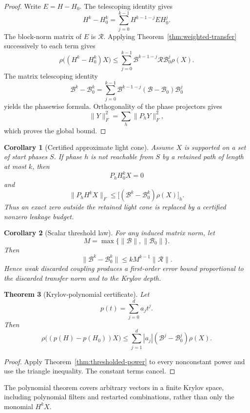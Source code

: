 \documentclass[11pt]{article}
\newtheorem{theorem}{Theorem}[section]
\newtheorem{corollary}[theorem]{Corollary}
\theoremstyle{definition}
\theoremstyle{remark}
\begin{document}
\begin{proof}
Write $E=H-H_0$.  The telescoping identity gives
\[
H^k-H_0^k
=
\sum_{j=0}^{k-1}H^{k-1-j}EH_0^j.
\]
The block-norm matrix of $E$ is $\mathcal R$.  Applying
Theorem~\ref{thm:weighted-transfer} successively to each term gives
\[
\rho\bigl((H^k-H_0^k)X\bigr)
\leq
\sum_{j=0}^{k-1}
\mathcal B^{k-1-j}\mathcal R\mathcal B_0^j\rho(X).
\]
The matrix telescoping identity
\[
\mathcal B^k-\mathcal B_0^k
=
\sum_{j=0}^{k-1}
\mathcal B^{k-1-j}(\mathcal B-\mathcal B_0)\mathcal B_0^j
\]
yields the phasewise formula.  Orthogonality of the phase projectors gives
\[
\lVert Y\rVert_F^2=\sum_h\lVert P_hY\rVert_F^2,
\]
which proves the global bound.
\end{proof}

\begin{corollary}[Certified approximate light cone]
\label{cor:approx-lightcone}
Assume $X$ is supported on a set of start phases $S$.  If phase $h$ is not
reachable from $S$ by a retained path of length at most $k$, then
\[
P_hH_0^kX=0
\]
and
\[
\boxed{
\lVert P_hH^kX\rVert_F
\leq
\bigl[(\mathcal B^k-\mathcal B_0^k)\rho(X)\bigr]_h.
}
\]
Thus an exact zero outside the retained light cone is replaced by a certified
nonzero leakage budget.
\end{corollary}

\begin{corollary}[Scalar threshold law]
For any induced matrix norm, let
\[
M=\max\{\lVert\mathcal B\rVert,\lVert\mathcal B_0\rVert\}.
\]
Then
\[
\boxed{
\lVert\mathcal B^k-\mathcal B_0^k\rVert
\leq
kM^{k-1}\lVert\mathcal R\rVert.
}
\]
Hence weak discarded coupling produces a first-order error bound proportional
to the discarded transfer norm and to the Krylov depth.
\end{corollary}

\begin{theorem}[Krylov-polynomial certificate]
\label{thm:polynomial-certificate}
Let
\[
p(t)=\sum_{j=0}^d a_jt^j.
\]
Then
\[
\boxed{
\rho\bigl((p(H)-p(H_0))X\bigr)
\leq
\sum_{j=1}^d
|a_j|(\mathcal B^j-\mathcal B_0^j)\rho(X).
}
\]
\end{theorem}

\begin{proof}
Apply Theorem~\ref{thm:thresholded-power} to every nonconstant power and use
the triangle inequality.  The constant terms cancel.
\end{proof}

The polynomial theorem covers arbitrary vectors in a finite Krylov space,
including polynomial filters and restarted combinations, rather than only the
monomial $H^kX$.
\end{document}
